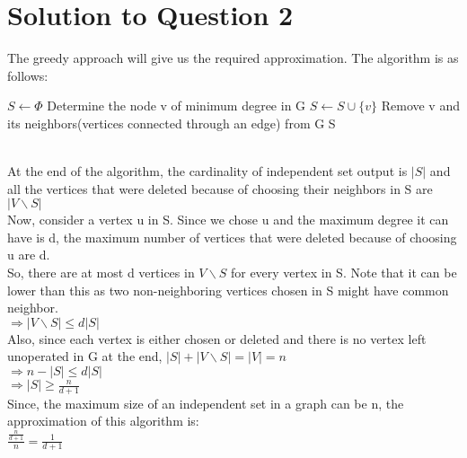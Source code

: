\documentclass[11pt]{article}
\begin{document}
\newpage
\section{Solution to Question 2}
The greedy approach will give us the required approximation. The algorithm is as follows:
    \begin{algorithm}
  \begin{algorithmic}
      \State $S \leftarrow \Phi$
          \State Determine the node v of minimum degree in G
          \State $S \leftarrow S \cup \{v\}$
          \State Remove v and its neighbors(vertices connected through an edge) from G
      \EndWhile
      \State \Return S
    \EndFunction
  \end{algorithmic}
\end{algorithm}\\
At the end of the algorithm, the cardinality of independent set output is $|S|$ and all the vertices that were deleted because of choosing their neighbors in S are $|V \backslash S|$ \\
Now, consider a vertex u in S. Since we chose u and the maximum degree it can have is d, the maximum number of vertices that were deleted because of choosing u are d. \\
So, there are at most d vertices in $V \backslash S$ for every vertex in S. Note that it can be lower than this as two non-neighboring vertices chosen in S might have common neighbor. \\
$\Longrightarrow |V \backslash S| \leq d|S| $ \\
Also, since each vertex is either chosen or deleted and there is no vertex left unoperated in G at the end, $|S| + |V \backslash S| = |V| = n$ \\
$\Longrightarrow n - |S| \leq d|S|$ \\
$\Longrightarrow |S| \geq \frac{n}{d+1}$ \\
Since, the maximum size of an independent set in a graph can be n, the approximation of this algorithm is: \\
$\frac{\frac{n}{d+1}}{n} = \frac{1}{d+1}$
\newpage
\end{document}
